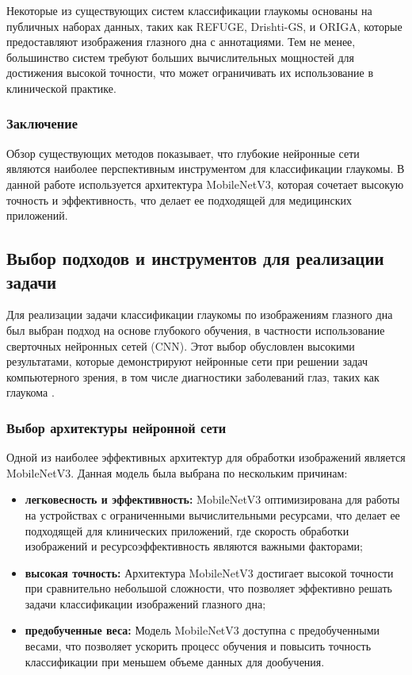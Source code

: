{    Некоторые из существующих систем классификации глаукомы основаны на публичных наборах данных, таких как REFUGE, Drishti-GS, и ORIGA, которые предоставляют изображения глазного дна с аннотациями. Тем не менее, большинство систем требуют больших вычислительных мощностей для достижения высокой точности, что может ограничивать их использование в клинической практике.

    \subsubsection*{Заключение}

    Обзор существующих методов показывает, что глубокие нейронные сети являются наиболее перспективным инструментом для классификации глаукомы. В данной работе используется архитектура MobileNetV3, которая сочетает высокую точность и эффективность, что делает ее подходящей для медицинских приложений.
    \vspace{13pt}
    \subsection{Выбор подходов и инструментов для реализации задачи}

    Для реализации задачи классификации глаукомы по изображениям глазного дна был выбран подход на основе глубокого обучения, в частности использование сверточных нейронных сетей (CNN). Этот выбор обусловлен высокими результатами, которые демонстрируют нейронные сети при решении задач компьютерного зрения, в том числе диагностики заболеваний глаз, таких как глаукома \cite{CNN}.

    \subsubsection*{Выбор архитектуры нейронной сети}

    Одной из наиболее эффективных архитектур для обработки изображений является MobileNetV3. Данная модель была выбрана по нескольким причинам:
    \begin{itemize}
        \item \textbf{легковесность и эффективность:} MobileNetV3 оптимизирована для работы на устройствах с ограниченными вычислительными ресурсами, что делает ее подходящей для клинических приложений, где скорость обработки изображений и ресурсоэффективность являются важными факторами;
        \item \textbf{высокая точность:} Архитектура MobileNetV3 достигает высокой точности при сравнительно небольшой сложности, что позволяет эффективно решать задачи классификации изображений глазного дна;
        \item \textbf{предобученные веса:} Модель MobileNetV3 доступна с предобученными весами, что позволяет ускорить процесс обучения и повысить точность классификации при меньшем объеме данных для дообучения.
    \end{itemize}

}
